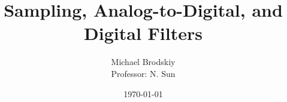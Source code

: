 


\title{Sampling, Analog-to-Digital, and Digital Filters}
\date{\today}
\author{Michael Brodskiy\\ \small Professor: N. Sun}



\maketitle

